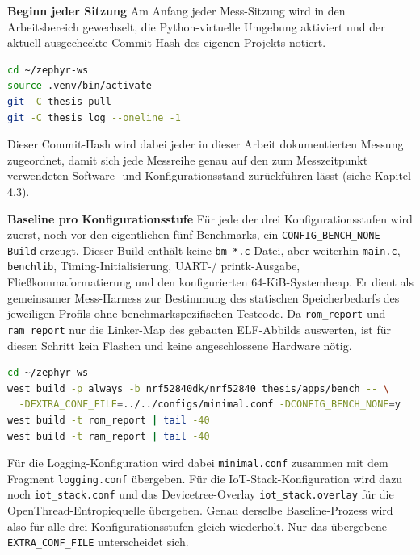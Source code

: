 \textbf{Beginn jeder Sitzung }Am Anfang jeder Mess-Sitzung wird in den Arbeitsbereich gewechselt, die Python-virtuelle Umgebung aktiviert und der aktuell ausgecheckte Commit-Hash des eigenen Projekts notiert.

\begin{lstlisting}[style=basecode,language=bash]
cd ~/zephyr-ws
source .venv/bin/activate
git -C thesis pull
git -C thesis log --oneline -1
\end{lstlisting}
Dieser Commit-Hash wird dabei jeder in dieser Arbeit dokumentierten Messung zugeordnet, damit sich jede Messreihe genau auf den zum Messzeitpunkt verwendeten Software- und Konfigurationsstand zurückführen lässt (siehe Kapitel 4.3).

\textbf{Baseline pro Konfigurationsstufe }Für jede der drei Konfigurationsstufen wird zuerst, noch vor den eigentlichen fünf Benchmarks, ein \lstinline[style=fileinline]|CONFIG_BENCH_NONE-Build| erzeugt. Dieser Build enthält keine \lstinline[style=fileinline]|bm_*.c|-Datei, aber weiterhin \lstinline[style=fileinline]|main.c|, \lstinline[style=fileinline]|benchlib|, Timing-Initialisierung, UART-/ printk-Ausgabe, Fließkommaformatierung und den konfigurierten 64-KiB-Systemheap. Er dient als gemeinsamer Mess-Harness zur Bestimmung des statischen Speicherbedarfs des jeweiligen Profils ohne benchmarkspezifischen Testcode. Da \lstinline[style=fileinline]|rom_report| und \lstinline[style=fileinline]|ram_report| nur die Linker-Map des gebauten ELF-Abbilds auswerten, ist für diesen Schritt kein Flashen und keine angeschlossene Hardware nötig.

\begin{lstlisting}[style=basecode,language=bash]
cd ~/zephyr-ws
west build -p always -b nrf52840dk/nrf52840 thesis/apps/bench -- \
  -DEXTRA_CONF_FILE=../../configs/minimal.conf -DCONFIG_BENCH_NONE=y
west build -t rom_report | tail -40
west build -t ram_report | tail -40
\end{lstlisting}
Für die Logging-Konfiguration wird dabei \lstinline[style=fileinline]|minimal.conf| zusammen mit dem Fragment \lstinline[style=fileinline]|logging.conf| übergeben. Für die IoT-Stack-Konfiguration wird dazu noch \lstinline[style=fileinline]|iot_stack.conf| und das Devicetree-Overlay \lstinline[style=fileinline]|iot_stack.overlay| für die OpenThread-Entropiequelle übergeben. Genau derselbe Baseline-Prozess wird also für alle drei Konfigurationsstufen gleich wiederholt. Nur das übergebene \lstinline[style=fileinline]|EXTRA_CONF_FILE| unterscheidet sich.

